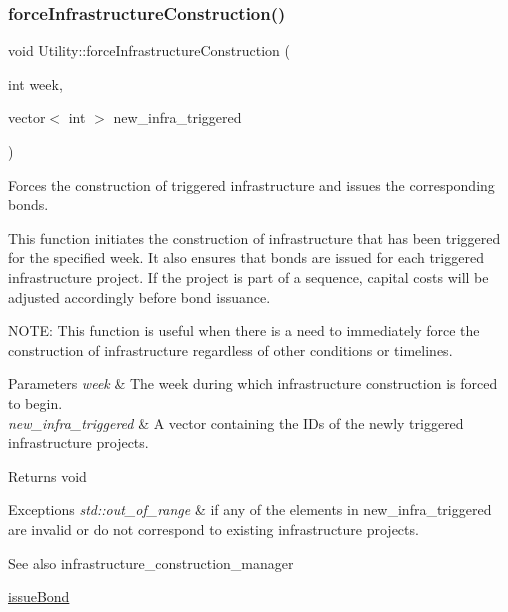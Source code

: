 \subsubsection{\texorpdfstring{force\+Infrastructure\+Construction()}{forceInfrastructureConstruction()}}
{\footnotesize\ttfamily void Utility\+::force\+Infrastructure\+Construction (\begin{DoxyParamCaption}\item[{int}]{week,  }\item[{vector$<$ int $>$}]{new\+\_\+infra\+\_\+triggered }\end{DoxyParamCaption})}



Forces the construction of triggered infrastructure and issues the corresponding bonds. 

This function initiates the construction of infrastructure that has been triggered for the specified week. It also ensures that bonds are issued for each triggered infrastructure project. If the project is part of a sequence, capital costs will be adjusted accordingly before bond issuance.

N\+O\+TE\+: This function is useful when there is a need to immediately force the construction of infrastructure regardless of other conditions or timelines.


\begin{DoxyParams}{Parameters}
{\em week} & The week during which infrastructure construction is forced to begin.\\
\hline
{\em new\+\_\+infra\+\_\+triggered} & A vector containing the I\+Ds of the newly triggered infrastructure projects.\\
\hline
\end{DoxyParams}
\begin{DoxyReturn}{Returns}
void
\end{DoxyReturn}

\begin{DoxyExceptions}{Exceptions}
{\em std\+::out\+\_\+of\+\_\+range} & if any of the elements in new\+\_\+infra\+\_\+triggered are invalid or do not correspond to existing infrastructure projects.\\
\hline
\end{DoxyExceptions}
\begin{DoxySeeAlso}{See also}
infrastructure\+\_\+construction\+\_\+manager 

\mbox{\hyperlink{classUtility_a152ceea2917ea7715e8fbf8aff24390f}{issue\+Bond}} 
\end{DoxySeeAlso}
\mbox{\label{classUtility_a70f24df5a7d4346ad0ebccd9b30960d3}} 
